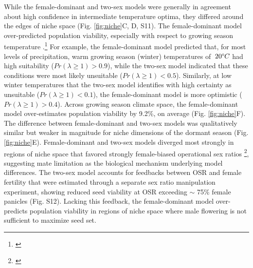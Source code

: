\documentclass[9pt,twocolumn,twoside,lineno]{pnas-new}
\newcommand{\tom}[2]{{\color{red}{#1}}\footnote{\textit{\color{red}{#2}}}}
\newcommand{\revise}[1]{{\color{Mahogany}{#1}}}
\begin{document}
While the female-dominant and two-sex models were generally in agreement about high confidence in intermediate temperature optima, they differed around the edges of niche space (Fig. \ref{fig:niche}C, D, S11). 
The female-dominant model over-predicted population viability, especially with respect to growing season temperature \revise {(Fig. \ref{fig:niche}E, F)}.\tom{}{In Fig 3 E,F the colors of the vertical lines do not match the colors of the density distributions.} 
For example, the female-dominant model predicted that, for most levels of precipitation, warm growing season (winter) temperatures of $\> 20\degree C$ had high suitability ($Pr(\lambda \ge 1) > 0.9$), while the two-sex model indicated that these conditions were most likely unsuitable ($Pr(\lambda \ge 1) < 0.5$). 
Similarly, at low winter temperatures that the two-sex model identifies with high certainty as unsuitable ($Pr(\lambda \ge 1) < 0.1$), the female-dominant model is more optimistic ($Pr(\lambda \ge 1) > 0.4$). 
Across growing season climate space, the female-dominant model over-estimates population viability by 9.2\%, on average (Fig. \ref{fig:niche}F). 
The difference between female-dominant and two-sex models was qualitatively similar but weaker in magnitude for niche dimensions of the dormant season (Fig. \ref{fig:niche}E).
Female-dominant and two-sex models diverged most strongly in regions of niche space that favored strongly female-biased operational sex ratios \revise {(Fig. S16 to S19)}\tom{}{These are the maps but wasn't there a niche space figure?}, suggesting mate limitation as the biological mechanism underlying model differences. 
The two-sex model accounts for feedbacks between OSR and female fertility that were estimated through a separate sex ratio manipulation experiment, showing reduced seed viability at OSR exceeding $\sim$ 75\% female panicles (Fig. S12).
Lacking this feedback, the female-dominant model over-predicts population viability in regions of niche space where male flowering is not sufficient to maximize seed set. 
\end{document}
